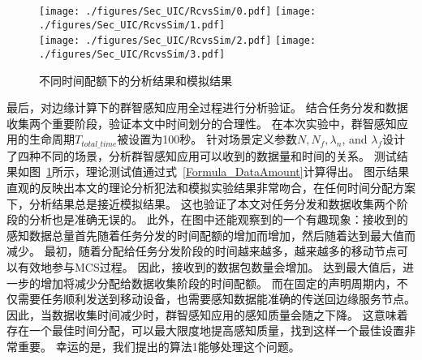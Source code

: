 
\begin{figure}[!b]
  \centering
  {\texttt{[image: ./figures/Sec\_UIC/RcvsSim/0.pdf]}}
  {\texttt{[image: ./figures/Sec\_UIC/RcvsSim/1.pdf]}}\\
  {\texttt{[image: ./figures/Sec\_UIC/RcvsSim/2.pdf]}}
  {\texttt{[image: ./figures/Sec\_UIC/RcvsSim/3.pdf]}}
  \vspace{-1em}
  \caption{不同时间配额下的分析结果和模拟结果}
  \label{Figure_EntireTest}
\end{figure}

最后，对边缘计算下的群智感知应用全过程进行分析验证。
结合任务分发和数据收集两个重要阶段，验证本文中时间划分的合理性。
在本次实验中，群智感知应用的生命周期$T_{total\_time}$被设置为100秒。
针对场景定义参数$N, N_f, \lambda_n$, and $\lambda_f$设计了四种不同的场景，分析群智感知应用可以收到的数据量和时间的关系。
测试结果如图~\ref{Figure_EntireTest}所示，理论测试值通过式~\eqref{Formula_DataAmount}计算得出。
图示结果直观的反映出本文的理论分析犯法和模拟实验结果非常吻合，在任何时间分配方案下，分析结果总是接近模拟结果。
这也验证了本文对任务分发和数据收集两个阶段的分析也是准确无误的。
此外，在图中还能观察到的一个有趣现象：接收到的感知数据总量首先随着任务分发的时间配额的增加而增加，然后随着达到最大值而减少。
最初，随着分配给任务分发阶段的时间越来越多，越来越多的移动节点可以有效地参与MCS过程。
因此，接收到的数据包数量会增加。
达到最大值后，进一步的增加将减少分配给数据收集阶段的时间配额。
而在固定的声明周期内，不仅需要任务顺利发送到移动设备，也需要感知数据能准确的传送回边缘服务节点。
因此，当数据收集时间减少时，群智感知应用的感知质量会随之下降。
这意味着存在一个最佳时间分配，可以最大限度地提高感知质量，找到这样一个最佳设置非常重要。
幸运的是，我们提出的算法1能够处理这个问题。

